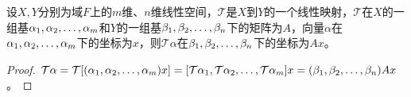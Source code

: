 \begin{theorem}\label{theo:LinearMappingCoordinate}
	设$X,Y$分别为域$F$上的$m$维、$n$维线性空间，$\mathcal{T}$是$X$到$Y$的一个线性映射，$\mathcal{T}$在$X$的一组基$\alpha_1, \alpha_2, \dots, \alpha_{m}$和$Y$的一组基$\beta_1, \beta_2, \dots, \beta_{n}$下的矩阵为$A$，向量$\alpha$在$\alpha_1, \alpha_2, \dots, \alpha_{m}$下的坐标为$x$，则$\mathcal{T}\alpha$在$\beta_1, \beta_2, \dots, \beta_{n}$下的坐标为$Ax$。
\end{theorem}
\begin{proof}
	$\mathcal{T}\alpha=\mathcal{T}[(\alpha_1, \alpha_2, \dots, \alpha_{m})x]=[\mathcal{T}\alpha_1, \mathcal{T}\alpha_2, \dots, \mathcal{T}\alpha_{m}]x=(\beta_1, \beta_2, \dots, \beta_{n})Ax$。
\end{proof}

